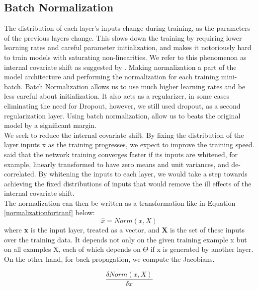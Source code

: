 \subsection{Batch Normalization}
The distribution of each layer's inputs change during training, as the parameters of the previous layers change. This slows down the training by requiring lower learning rates and careful parameter initialization, and makes it notoriously hard to train models with saturating non-linearities. We refer to this phenomenon as internal covariate shift as suggested by \cite{ioffe2015batch}. Making normalization a part of the model architecture and performing the normalization for each training mini-batch. Batch Normalization allows us to use much higher learning rates and be less careful about initialization. It also acts as a regularizer, in some cases eliminating the need for Dropout, however, we still used dropout, as a second regularization layer. Using batch normalization, allow us to beats the original model by a significant margin.\\

We seek to reduce the internal covariate shift. By fixing the distribution of the layer inputs x as the training progresses, we expect to improve the training speed. \cite{lecun2012efficient} said that the network training converges faster if its inputs are whitened, for example, linearly transformed to have zero means and unit variances, and de-correlated. By whitening the inputs to each layer, we would take a step towards achieving the fixed distributions of inputs that would remove the ill effects of the
internal covariate shift.\\

The normalization can then be written as a transformation like in Equation \ref{normalizationfortranf} below:
\begin{equation}\label{normalizationfortranf}
     \widehat{x}=Norm(x,X)
\end{equation}
where \textbf{x} is the input layer, treated as a vector, and \textbf{X} is the set of these inputs over the training data. It depends not only on the given training example x but on all examples X, each of which depends on $\Theta$ if
x is generated by another layer. On the other hand, for back-propagation, we compute the Jacobians.

\begin{equation}\label{derivative1}
     \frac{\delta Norm(x,X)}{\delta x}
\end{equation}

